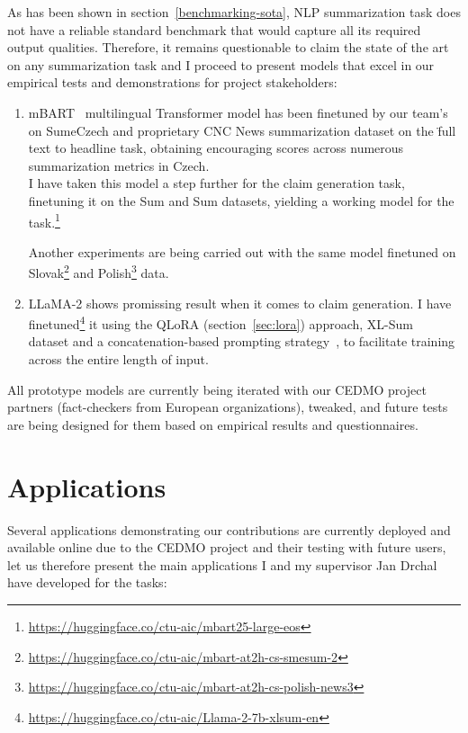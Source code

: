 As has been shown in section~\ref{benchmarking-sota}, NLP summarization task does not have a reliable standard benchmark that would capture all its required output qualities. Therefore, it remains questionable to claim the state of the art on any summarization task and I proceed to present models that excel in our empirical tests and demonstrations for project stakeholders:

\begin{enumerate}
    \item {\techbf mBART}~\cite{mbart} multilingual Transformer model has been finetuned by our team's~\cite{krotil} on SumeCzech and proprietary CNC News summarization dataset on the \"{full text to headline} task, obtaining encouraging scores across numerous summarization metrics in Czech.\\
    I have taken this model a step further for the claim generation task, finetuning it on the {\FCZ}Sum and {\CTK}Sum datasets, yielding a working model for the task.\footnote{
    \url{https://huggingface.co/ctu-aic/mbart25-large-eos}}

    Another experiments are being carried out with the same model finetuned on Slovak\footnote{\url{https://huggingface.co/ctu-aic/mbart-at2h-cs-smesum-2}} and Polish\footnote{\url{https://huggingface.co/ctu-aic/mbart-at2h-cs-polish-news3}} data.
    \item {\techbf LLaMA-2} shows promissing result when it comes to claim generation.
    I have finetuned\footnote{\url{https://huggingface.co/ctu-aic/Llama-2-7b-xlsum-en}} it using the QLoRA (section~\ref{sec:lora}) approach, XL-Sum~\cite{xlsum} dataset and a concatenation-based prompting strategy~\cite{llama2}, to facilitate training across the entire length of input.
    
\end{enumerate}

All prototype models are currently being iterated with our CEDMO project partners (fact-checkers from European organizations),  tweaked, and future tests are being designed for them based on empirical results and questionnaires.


\section{Applications}
\label{sec:applications}
Several applications demonstrating our contributions are currently deployed and available online due to the CEDMO project and their testing with future users, let us therefore present the main applications I and my supervisor Jan Drchal have developed for the tasks:

